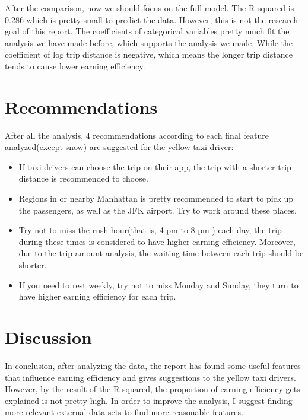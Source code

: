\documentclass[11pt]{article}
\begin{document}
After the comparison, now we should focus on the full model. The R-squared is 0.286 which is pretty small to predict the data. However, this is not the research goal of this report. The coefficients of categorical variables pretty much fit the analysis we have made before, which supports the analysis we made. While the coefficient of log trip distance is negative, which means the longer trip distance tends to cause lower earning efficiency.

\section{Recommendations}
After all the analysis, 4 recommendations according to each final feature analyzed(except snow) are suggested for the yellow taxi driver:
\begin{itemize}
\item If taxi drivers can choose the trip on their app, the trip with a shorter trip distance is recommended to choose.
\item Regions in or nearby Manhattan is pretty recommended to start to pick up the passengers, as well as the JFK airport. Try to work around these places.
\item Try not to miss the rush hour(that is, 4 pm to 8 pm ) each day, the trip during these times is considered to have higher earning efficiency. Moreover, due to the trip amount analysis, the waiting time between each trip should be shorter.
\item If you need to rest weekly, try not to miss Monday and Sunday, they turn to have higher earning efficiency for each trip.

\end{itemize}

\section{Discussion}
In conclusion, after analyzing the data, the report has found some useful features that influence earning efficiency and gives suggestions to the yellow taxi drivers. However, by the result of the R-squared, the proportion of earning efficiency gets explained is not pretty high. In order to improve the analysis, I suggest finding more relevant external data sets to find more reasonable features.


\clearpage

\printbibliography
\end{document}
